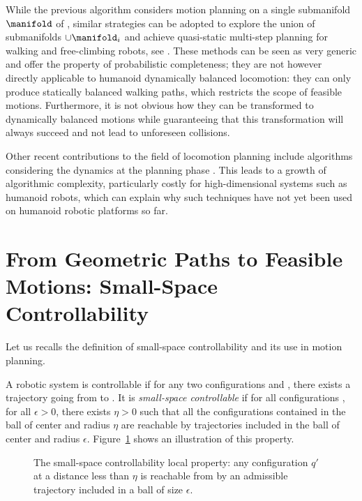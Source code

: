 While the previous algorithm considers motion planning on a single
submanifold $\manifold$ of {\cspace}, similar strategies can be
adopted to explore the union of submanifolds $\cup\manifold_{i}$ and
achieve quasi-static multi-step planning for walking and free-climbing
robots, see \cite{bretl2006motion, haus10}. These methods can be seen
as very generic and offer the property of probabilistic completeness;
they are not however directly applicable to humanoid dynamically
balanced locomotion: they can only produce statically balanced walking
paths, which restricts the scope of feasible motions. Furthermore, it
is not obvious how they can be transformed to dynamically balanced
motions while guaranteeing that this transformation will always
succeed and not lead to unforeseen collisions.

Other recent contributions to the field of locomotion planning include
algorithms considering the dynamics at the planning phase
\cite{glassman2010quadratic, shkolnik2011bounding}. This leads to a
growth of algorithmic complexity, particularly costly for
high-dimensional systems such as humanoid robots, which can explain
why such techniques have not yet been used on humanoid robotic
platforms so far.

\section{From Geometric Paths to Feasible Motions: Small-Space Controllability}
\label{sec:ssc} 

Let us recalls the definition of small-space controllability and its
use in motion planning.

A robotic system is controllable if for any two configurations 
and , there exists a trajectory going from  to .  It is
\textit{small-space controllable} if for all configurations \config{}, for
all $\epsilon >0$, there exists $\eta >0$ such that all the
configurations contained in the ball of center \config{} and radius $\eta$
are reachable by trajectories included in the ball of center \config{} and
radius $\epsilon$. Figure~\ref{fig:ssc1} shows an illustration of this
property.

\begin{figure}
  \centering
  

  \caption{The small-space controllability local property:  any configuration $q'$ 
    at a distance less than
    $\eta$ is reachable from \config{} by an admissible trajectory included in
    a ball of size $\epsilon$.}
  \label{fig:ssc1}
\end{figure}

